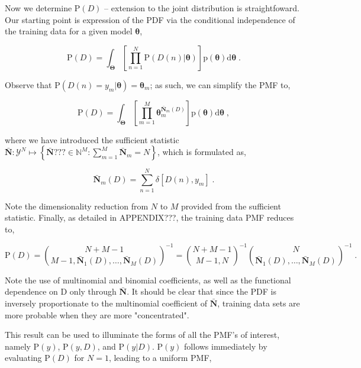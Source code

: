 \documentclass[12pt]{article}
\begin{document}
Now we determine $\text{P}(D)$ -- extension to the joint distribution is straightfoward. Our starting point is expression of the PDF via the conditional independence of the training data for a given model $\bm{\theta}$,

\begin{equation}
\text{P}(D) = \int_{\bm{\Theta}} \left[ \prod_{n=1}^N \text{P}(D(n) | \bm{\theta}) \right] \text{p}(\bm{\theta}) \mathrm{d}\bm{\theta} \;.
\end{equation}

Observe that $\text{P}(D(n) = y_m | \bm{\theta}) = \bm{\theta}_m$; as such, we can simplify the PMF to,

\begin{equation}
\text{P}(D) = \int_{\bm{\Theta}} \left[ \prod_{m=1}^M \bm{\theta}_m^{\bar{\bm{N}}_m(D)} \right] \text{p}(\bm{\theta}) \mathrm{d}\bm{\theta} \;,
\end{equation}

where we have introduced the sufficient statistic $\bar{\bm{N}}: \mathcal{Y}^N \mapsto \left\{ \bar{\bm{N}}??? \in \mathbb{N}^M: \sum_{m=1}^M \bar{\bm{N}}_m = N \right\}$, which is formulated as,

\begin{equation}
\bar{\bm{N}}_m(D) = \sum_{n=1}^N \delta[D(n),y_m] \;.
\end{equation}

Note the dimensionality reduction from $N$ to $M$ provided from the sufficient statistic. Finally, as detailed in APPENDIX???, the training data PMF reduces to,

\begin{equation}
\text{P}(D) = \binom{N+M-1}{M-1,\bar{\bm{N}}_1(D),\ldots,\bar{\bm{N}}_M(D)}^{-1} 
= \binom{N+M-1}{M-1,N}^{-1} \binom{N}{\bar{\bm{N}}_1(D),\ldots,\bar{\bm{N}}_M(D)}^{-1} \;.
\end{equation}

Note the use of multinomial and binomial coefficients, as well as the functional dependence on $\mathrm{D}$ only through $\bar{\bm{N}}$. It should be clear that since the PDF is inversely proportionate to the multinomial coefficient of $\bar{\bm{N}}$, training data sets are more probable when they are more "concentrated". 

This result can be used to illuminate the forms of all the PMF's of interest, namely $\text{P}(y)$, $\text{P}(y,D)$, and $\text{P}(y | D)$.  $\text{P}(y)$ follows immediately by evaluating $\text{P}(D)$ for $N=1$, leading to a uniform PMF,
\end{document}
